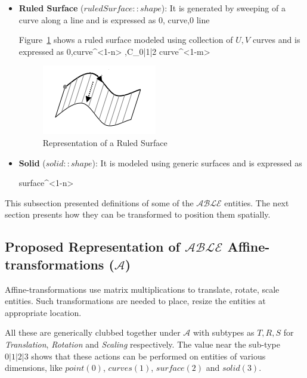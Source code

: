 \begin{itemize}[noitemsep,topsep=2pt,parsep=2pt,partopsep=2pt]
\item {\bf Ruled Surface} ($ruledSurface::shape$): It is generated by sweeping of a curve along a line and is expressed as  {0, curve,0} {line}

Figure~\ref{fig:abstraction:hodasurface} shows a ruled surface modeled using collection of $U,V$ curves and is expressed as  {0,curve{^{<1-n>} },C_{0|1|2}} {curve{^{<1-m>} }}   

\smallskip

\begin{figure}[!h]
\centering 
\includegraphics[width=0.35\linewidth]{images/hodasurface} 
\caption{Representation of a Ruled Surface}
\label{fig:abstraction:hodasurface}
\end{figure}

\smallskip

\item {\bf Solid} ($solid::shape$): It is modeled using generic surfaces and is expressed as 

 {surface{^{<1-n>} }}

\end{itemize}

This subsection presented definitions of some of the $\mathcal{ABLE}$ entities. The next section presents how they can be transformed to position them spatially.


\subsection{Proposed Representation of $\mathcal{ABLE}$ Affine-transformations ($\mathcal{A}$)}

Affine-transformations use matrix multiplications to translate, rotate, scale entities. Such transformations are needed to place, resize the entities at appropriate location. 

All these are generically clubbed together under {\bf $\mathcal{A}$} with subtypes as $T,R,S$ for {\em Translation}, {\em Rotation} and {\em Scaling} respectively. The value near the sub-type ${0|1|2|3 }$ shows that these actions can be performed on entities of various dimensions, like $point (0)$, $curves(1)$, $surface(2)$ and $solid(3)$. 


